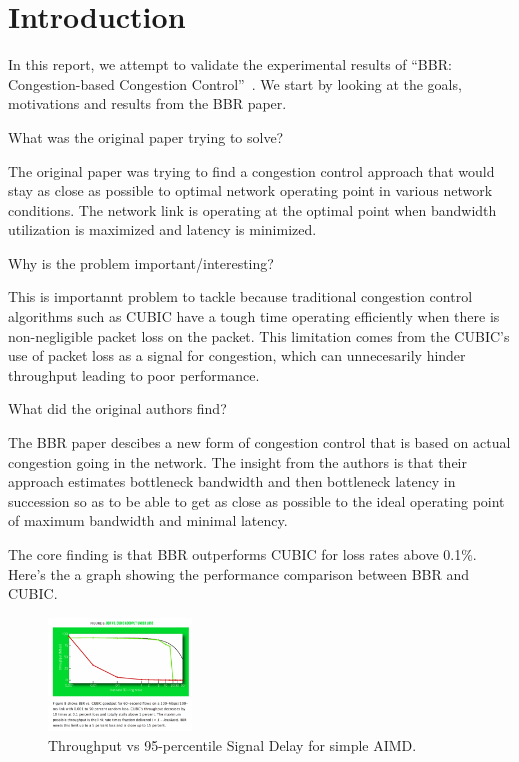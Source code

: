 
\section{Introduction}
In this report, we attempt to validate the experimental results of ``BBR:
Congestion-based Congestion Control''~\cite{cardwell2016bbr}. We start
by looking at the goals, motivations and results from the BBR
\cite{cardwell2016bbr} paper.

What was the original paper trying to solve?

The original paper was trying to find a congestion control approach
that would stay as close as possible to optimal network operating point
in various network conditions. The network link is operating at the optimal
point when bandwidth utilization is maximized and latency is minimized.

Why is the problem important/interesting?

This is importannt problem to tackle because traditional congestion control
algorithms such as CUBIC have a tough time operating efficiently when there
is non-negligible packet loss on the packet. This limitation comes from the
CUBIC's use of packet loss as a signal for congestion, which can unnecesarily
hinder throughput leading to poor performance.


What did the original authors find?

The BBR paper descibes a new form of congestion control that is based on actual
congestion going in the network. The insight from the authors is that their
approach estimates bottleneck bandwidth and then bottleneck latency in succession
so as to be able to get as close as possible to the ideal operating point of
maximum bandwidth and minimal latency.

The core finding is that BBR outperforms CUBIC for loss rates above 0.1\%. Here's
the a graph showing the performance comparison between BBR and CUBIC.


\begin{figure}[h]
  \centering
  \includegraphics[height=3cm]{./img/bbr_fig8.png}
  \caption{Throughput vs 95-percentile Signal Delay for simple AIMD.}
  \label{fig:exb}
\end{figure}